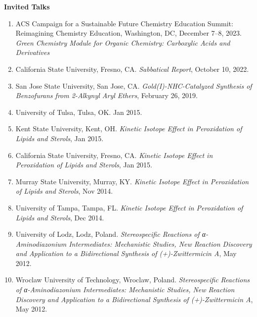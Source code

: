 \documentclass[11pt,letterpaper]{article}
\begin{document}
\bigskip
\textbf{Invited Talks} \newline
\begin{enumerate}[itemindent=0pt]
  \item{ACS Campaign for a Sustainable Future Chemistry Education Summit: Reimagining Chemistry Education, Washington, DC, December 7--8, 2023. \emph{Green Chemistry Module for Organic Chemistry: Carboxylic Acids and Derivatives}}
  \item{California State University, Fresno, CA. \emph{Sabbatical Report}, October 10, 2022.}
  \item {San Jose State University, San Jose, CA. \emph{Gold(I)-NHC-Catalyzed Synthesis of Benzofurans from 2-Alkynyl Aryl Ethers}, February 26, 2019.}
  \item {University of Tulsa, Tulsa, OK. \emph{} Jan 2015.}
  \item {Kent State University, Kent, OH. \emph{Kinetic Isotope Effect in Peroxidation of Lipids and Sterols}, Jan 2015.}
  \item {California State University, Fresno, CA. \emph{Kinetic Isotope Effect in Peroxidation of Lipids and Sterols}, Jan 2015.}
  \item {Murray State University, Murray, KY. \emph{Kinetic Isotope Effect in Peroxidation of Lipids and Sterols}, Nov 2014.}
  \item {University of Tampa, Tampa, FL. \emph{Kinetic Isotope Effect in Peroxidation of Lipids and Sterols}, Dec 2014.}
  \item {University of Lodz, Lodz, Poland. \emph{Stereospecific Reactions of α-Aminodiazonium Intermediates: Mechanistic Studies, New Reaction Discovery and Application to a Bidirectional Synthesis of (+)-Zwittermicin A}, May 2012.}
  \item {Wroclaw University of Technology, Wroclaw, Poland. \emph{Stereospecific Reactions of α-Aminodiazonium Intermediates: Mechanistic Studies, New Reaction Discovery and Application to a Bidirectional Synthesis of (+)-Zwittermicin A}, May 2012.}
\end{enumerate}

\end{document}
